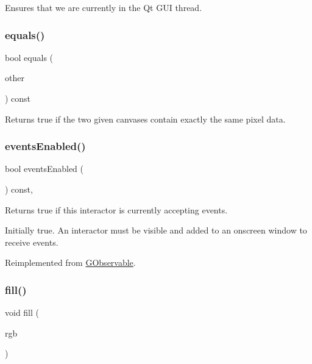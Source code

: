 Ensures that we are currently in the Qt G\+UI thread. 

\mbox{\label{classGCanvas_a7cf0de4c4124b7de747b9cc17edd6ab9}} 
\subsubsection{\texorpdfstring{equals()}{equals()}}
{\footnotesize\ttfamily bool equals (\begin{DoxyParamCaption}\item[{const \mbox{\hyperlink{classGCanvas}{G\+Canvas}} \&}]{other }\end{DoxyParamCaption}) const\hspace{0.3cm}{\ttfamily [virtual]}}



Returns true if the two given canvases contain exactly the same pixel data. 

\mbox{\label{classGInteractor_ac05ba5b92e2e5146d416fe7f842a0969}} 
\subsubsection{\texorpdfstring{events\+Enabled()}{eventsEnabled()}}
{\footnotesize\ttfamily bool events\+Enabled (\begin{DoxyParamCaption}{ }\end{DoxyParamCaption}) const\hspace{0.3cm}{\ttfamily [virtual]}, {\ttfamily [inherited]}}



Returns true if this interactor is currently accepting events. 

Initially true. An interactor must be visible and added to an onscreen window to receive events. 

Reimplemented from \mbox{\hyperlink{classGObservable_a8ebb3da91032e7f4c34485dabc518b8a}{G\+Observable}}.

\mbox{\label{classGCanvas_acaf90d64e4fea8f776e722976aeb5070}} 
\subsubsection{\texorpdfstring{fill()}{fill()}\hspace{0.1cm}{\footnotesize\ttfamily [1/2]}}
{\footnotesize\ttfamily void fill (\begin{DoxyParamCaption}\item[{int}]{rgb }\end{DoxyParamCaption})\hspace{0.3cm}{\ttfamily [virtual]}}



